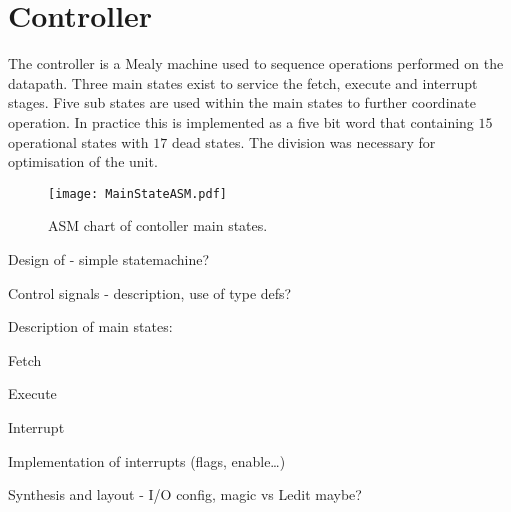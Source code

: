 \section{Controller}

The controller is a Mealy machine used to sequence operations performed on the datapath.
Three main states exist to service the fetch, execute and interrupt stages.
Five sub states are used within the main states to further coordinate operation.
In practice this is implemented as a five bit word that containing $15$ operational states with $17$ dead states. 
The division was necessary for optimisation of the unit.


\begin{figure}[ht]
   \centering
    \texttt{[image: MainStateASM.pdf]}
		\caption{ASM chart of contoller main states.}%
   \label{fig:MainStateASM}
\end{figure}



Design of - simple statemachine?

Control signals - description, use of type defs?

Description of main states:

Fetch

Execute

Interrupt

Implementation of interrupts (flags, enable\dots)

Synthesis and layout - I/O config, magic vs Ledit maybe?
